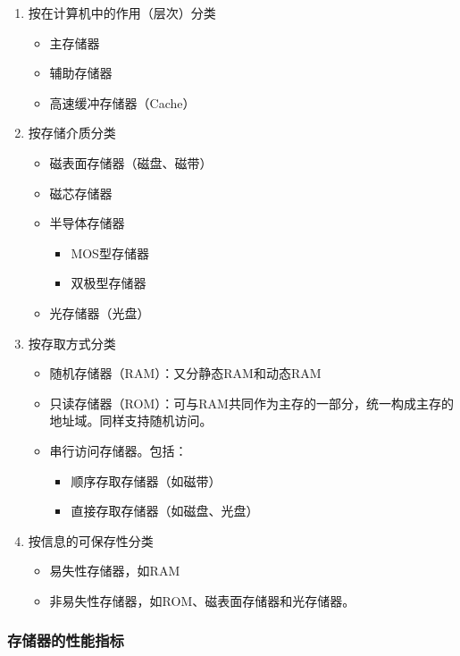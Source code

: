 \documentclass[12pt, a4paper, oneside]{ctexart}
\begin{document}
\begin{enumerate}
  \item {\kaishu 按在计算机中的作用（层次）分类}
  \begin{itemize}
    \item 主存储器
    \item 辅助存储器
    \item 高速缓冲存储器（Cache）
  \end{itemize}
  \item {\kaishu 按存储介质分类}
  \begin{itemize}
    \item 磁表面存储器（磁盘、磁带）
    \item 磁芯存储器
    \item 半导体存储器
    \begin{itemize}
      \item MOS型存储器
      \item 双极型存储器
    \end{itemize}
    \item 光存储器（光盘）
  \end{itemize}
  \item {\kaishu 按存取方式分类}
  \begin{itemize}
    \item 随机存储器（RAM）：又分静态RAM和动态RAM
    \item 只读存储器（ROM）：可与RAM共同作为主存的一部分，统一构成主存的地址域。同样支持随机访问。
    \item 串行访问存储器。包括：
    \begin{itemize}
      \item 顺序存取存储器（如磁带）
      \item 直接存取存储器（如磁盘、光盘）
    \end{itemize}
  \end{itemize}
  \item {\kaishu 按信息的可保存性分类}
  \begin{itemize}
    \item 易失性存储器，如RAM
    \item 非易失性存储器，如ROM、磁表面存储器和光存储器。
  \end{itemize}
\end{enumerate}

\subsubsection{存储器的性能指标}
\end{document}
